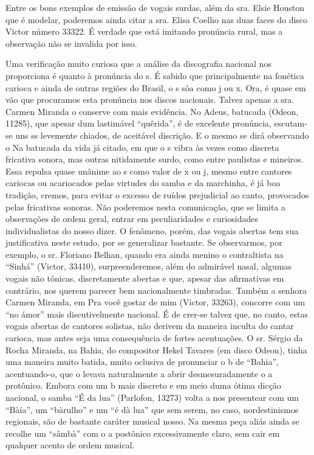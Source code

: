 Entre os bons exemplos de emissão de vogais surdas, além da sra. Elsie
Houston que é modelar, poderemos ainda citar a sra. Elisa Coelho nas
duas faces do disco Victor número 33322. É verdade que está imitando
pronúncia rural, mas a observação não se invalida por isso.

Uma verificação muito curiosa que a análise da discografia nacional nos
proporciona é quanto à pronúncia do s. É sabido que principalmente na
fonética carioca e ainda de outras regiões do Brasil, o s sôa como j ou
x. Ora, é quase em vão que procuramos esta pronúncia nos discos
nacionais. Talvez apenas a sra. Carmen Miranda o conserve com mais
evidência. No Adeus, batucada (Odeon, 11285), que apesar dum lastimável
``quêrida'', é de excelente pronúncia, escutam-se uns ss levemente
chiados, de aceitável discrição. E o mesmo se dirá observando o Na
batucada da vida já citado, em que o s vibra às vezes como discreta
fricativa sonora, mas outras nitidamente surdo, como entre paulistas e
mineiros. Essa repulsa quase unânime ao s como valor de x ou j, mesmo
entre cantores cariocas ou acariocados pelas virtudes do samba e da
marchinha, é já boa tradição, cremos, para evitar o excesso de ruídos
prejudicial ao canto, provocados pelas fricativas sonoras. Não poderemos
nesta comunicação, que se limita a observações de ordem geral, entrar em
peculiaridades e curiosidades individualistas do nosso dizer. O
fenômeno, porém, das vogais abertas tem sua justificativa neste estudo,
por se generalizar bastante. Se observarmos, por exemplo, o sr. Floriano
Belhan, quando era ainda menino o contraltista na ``Sinhá'' (Victor,
33410), surpreenderemos, além do admirável nasal, algumas vogais não
tônicas, discretamente abertas e que, apesar das afirmativas em
contrário, nos querem parecer bem nacionalmente timbradas. Também a
senhora Carmen Miranda, em Pra você gostar de mim (Victor, 33263),
concorre com um ``no ámor'' mais discutivelmente nacional. É de crer-se
talvez que, no canto, estas vogais abertas de cantores solistas, não
derivem da maneira inculta do cantar carioca, mas antes seja uma
consequência de fortes acentuações. O sr. Sérgio da Rocha Miranda, na
Bahia, do compositor Hekel Tavares (em disco Odeon), tinha uma maneira
muito batida, muito oclusiva de pronunciar o b de ``Bahia'',
acentuando-o, que o levava naturalmente a abrir desmesuradamente o a
protônico. Embora com um b mais discreto e em meio duma ótima dicção
nacional, o samba ``É da lua'' (Parlofon, 13273) volta a nos presentear
com um ``Bàía'', um ``bàrulho'' e um ``é dà lua'' que sem serem, no
caso, nordestinismos regionais, são de bastante caráter musical nosso.
Na mesma peça aliás ainda se recolhe um ``sâmbà'' com o a postônico
excessivamente claro, sem cair em qualquer acento de ordem musical.


